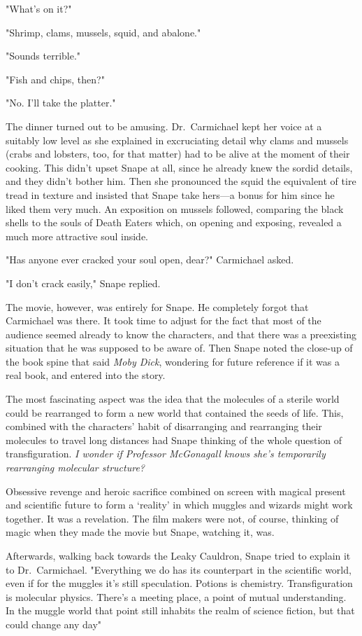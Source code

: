"What's on it?"

"Shrimp, clams, mussels, squid, and abalone."

"Sounds terrible."

"Fish and chips, then?"

"No. I'll take the platter."

The dinner turned out to be amusing. Dr.~Carmichael kept her voice at a suitably low level as she explained in excruciating detail why clams and mussels (crabs and lobsters, too, for that matter) had to be alive at the moment of their cooking. This didn't upset Snape at all, since he already knew the sordid details, and they didn't bother him. Then she pronounced the squid the equivalent of tire tread in texture and insisted that Snape take hers—a bonus for him since he liked them very much. An exposition on mussels followed, comparing the black shells to the souls of Death Eaters which, on opening and exposing, revealed a much more attractive soul inside.

"Has anyone ever cracked your soul open, dear?" Carmichael asked.

"I don't crack easily," Snape replied.

The movie, however, was entirely for Snape. He completely forgot that Carmichael was there. It took time to adjust for the fact that most of the audience seemed already to know the characters, and that there was a preexisting situation that he was supposed to be aware of. Then Snape noted the close-up of the book spine that said \emph{Moby Dick}, wondering for future reference if it was a real book, and entered into the story.

The most fascinating aspect was the idea that the molecules of a sterile world could be rearranged to form a new world that contained the seeds of life. This, combined with the characters' habit of disarranging and rearranging their molecules to travel long distances had Snape thinking of the whole question of transfiguration. \emph{I wonder if Professor McGonagall knows she's temporarily rearranging molecular structure?}

Obsessive revenge and heroic sacrifice combined on screen with magical present and scientific future to form a `reality' in which muggles and wizards might work together. It was a revelation. The film makers were not, of course, thinking of magic when they made the movie but Snape, watching it, was.

Afterwards, walking back towards the Leaky Cauldron, Snape tried to explain it to Dr.~Carmichael. "Everything we do has its counterpart in the scientific world, even if for the muggles it's still speculation. Potions is chemistry. Transfiguration is molecular physics. There's a meeting place, a point of mutual understanding. In the muggle world that point still inhabits the realm of science fiction, but that could change any day{\el}"

